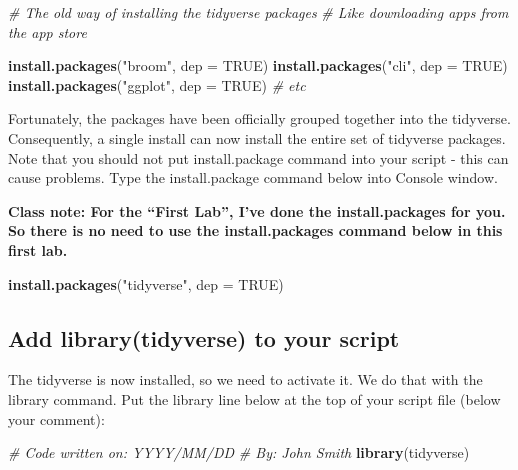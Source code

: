 \documentclass[
]{krantz}
\makeatletter
\newenvironment{Shaded}{\begin{snugshade}}{\end{snugshade}}
\newcommand{\CommentTok}[1]{\textcolor[rgb]{0.37,0.37,0.37}{\textit{#1}}}
\newcommand{\DataTypeTok}[1]{\textcolor[rgb]{0.27,0.27,0.27}{#1}}
\newcommand{\KeywordTok}[1]{\textcolor[rgb]{0.27,0.27,0.27}{\textbf{#1}}}
\newcommand{\NormalTok}[1]{#1}
\newcommand{\OtherTok}[1]{\textcolor[rgb]{0.37,0.37,0.37}{#1}}
\newcommand{\StringTok}[1]{\textcolor[rgb]{0.5,0.5,0.5}{#1}}
\newenvironment{kframe}{%
\medskip{}
\setlength{\fboxsep}{.8em}
 \def\at@end@of@kframe{}%
 \ifinner\ifhmode%
  \def\at@end@of@kframe{\end{minipage}}%
  \begin{minipage}{\columnwidth}%
 \fi\fi%
 \def\FrameCommand##1{\hskip\@totalleftmargin \hskip-\fboxsep
 \colorbox{shadecolor}{##1}\hskip-\fboxsep
     \hskip-\linewidth \hskip-\@totalleftmargin \hskip\columnwidth}%
 \MakeFramed {\advance\hsize-\width
   \@totalleftmargin\z@ \linewidth\hsize
   \@setminipage}}%
 {\par\unskip\endMakeFramed%
 \at@end@of@kframe}
\renewenvironment{Shaded}{\begin{kframe}}{\end{kframe}}
\makeatother
\begin{document}
\begin{Shaded}
\begin{Highlighting}[]
\CommentTok{# The old way of installing the tidyverse packages}
\CommentTok{# Like downloading apps from the app store}

\KeywordTok{install.packages}\NormalTok{(}\StringTok{"broom"}\NormalTok{, }\DataTypeTok{dep =} \OtherTok{TRUE}\NormalTok{)}
\KeywordTok{install.packages}\NormalTok{(}\StringTok{"cli"}\NormalTok{, }\DataTypeTok{dep =} \OtherTok{TRUE}\NormalTok{)}
\KeywordTok{install.packages}\NormalTok{(}\StringTok{"ggplot"}\NormalTok{, }\DataTypeTok{dep =} \OtherTok{TRUE}\NormalTok{)}
\CommentTok{# etc}
\end{Highlighting}
\end{Shaded}

Fortunately, the packages have been officially grouped together into the tidyverse. Consequently, a single install can now install the entire set of tidyverse packages. Note that you should not put install.package command into your script - this can cause problems.
Type the install.package command below into Console window.

\textbf{Class note: For the ``First Lab'', I've done the install.packages for you. So there is no need to use the install.packages command below in this first lab.}

\begin{Shaded}
\begin{Highlighting}[]
\KeywordTok{install.packages}\NormalTok{(}\StringTok{"tidyverse"}\NormalTok{, }\DataTypeTok{dep =} \OtherTok{TRUE}\NormalTok{)}
\end{Highlighting}
\end{Shaded}

\hypertarget{add-librarytidyverse-to-your-script}{%
\subsection{Add library(tidyverse) to your script}\label{add-librarytidyverse-to-your-script}}

The tidyverse is now installed, so we need to activate it.
We do that with the library command. Put the library line below at the top of your script file (below your comment):

\begin{Shaded}
\begin{Highlighting}[]
\CommentTok{# Code written on: YYYY/MM/DD }
\CommentTok{# By: John Smith}
\KeywordTok{library}\NormalTok{(tidyverse)}
\end{Highlighting}
\end{Shaded}
\end{document}
